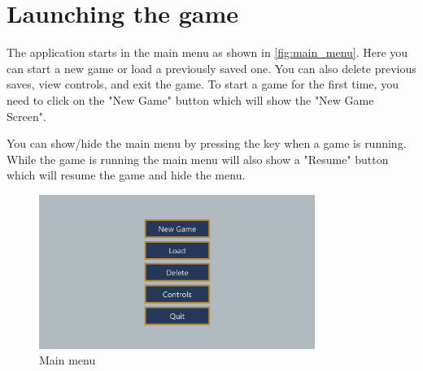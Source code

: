 \section{Launching the game}
The application starts in the main menu as shown in \autoref{fig:main_menu}.
Here you can start a new game or load a previously saved one.
You can also delete previous saves, view controls, and exit the game.
To start a game for the first time, you need to click on the "New Game" button which will show the "New Game Screen".

You can show/hide the main menu by pressing the \keys{\escwin} key when a game is running.
While the game is running the main menu will also show a "Resume" button which will resume the game and hide the menu.

\begin{figure}[H]
    \centering
    \includegraphics[width=0.8\textwidth]{chapters/user_manual/resources/main-menu.png}
    \caption{Main menu}
    \label{fig:main_menu}
\end{figure}